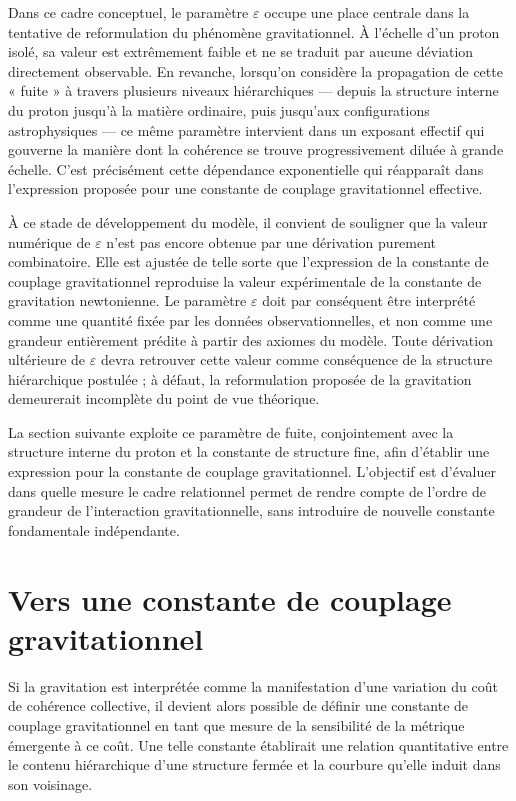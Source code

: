 \documentclass[11pt,a4paper]{article}
\begin{document}
Dans ce cadre conceptuel, le paramètre \(\varepsilon\) occupe une place centrale dans la tentative de reformulation du phénomène gravitationnel. À l’échelle d’un proton isolé, sa valeur est extrêmement faible et ne se traduit par aucune déviation directement observable. En revanche, lorsqu’on considère la propagation de cette « fuite » à travers plusieurs niveaux hiérarchiques — depuis la structure interne du proton jusqu’à la matière ordinaire, puis jusqu’aux configurations astrophysiques — ce même paramètre intervient dans un exposant effectif qui gouverne la manière dont la cohérence se trouve progressivement diluée à grande échelle. C’est précisément cette dépendance exponentielle qui réapparaît dans l’expression proposée pour une constante de couplage gravitationnel effective.

À ce stade de développement du modèle, il convient de souligner que la valeur numérique de \(\varepsilon\) n’est pas encore obtenue par une dérivation purement combinatoire. Elle est ajustée de telle sorte que l’expression de la constante de couplage gravitationnel reproduise la valeur expérimentale de la constante de gravitation newtonienne. Le paramètre \(\varepsilon\) doit par conséquent être interprété comme une quantité fixée par les données observationnelles, et non comme une grandeur entièrement prédite à partir des axiomes du modèle. Toute dérivation ultérieure de \(\varepsilon\) devra retrouver cette valeur comme conséquence de la structure hiérarchique postulée ; à défaut, la reformulation proposée de la gravitation demeurerait incomplète du point de vue théorique.

La section suivante exploite ce paramètre de fuite, conjointement avec la structure interne du proton et la constante de structure fine, afin d’établir une expression pour la constante de couplage gravitationnel. L’objectif est d’évaluer dans quelle mesure le cadre relationnel permet de rendre compte de l’ordre de grandeur de l’interaction gravitationnelle, sans introduire de nouvelle constante fondamentale indépendante.

\section{Vers une constante de couplage gravitationnel}

Si la gravitation est interprétée comme la manifestation d’une variation du coût de cohérence collective, il devient alors possible de définir une constante de couplage gravitationnel en tant que mesure de la sensibilité de la métrique émergente à ce coût. Une telle constante établirait une relation quantitative entre le contenu hiérarchique d’une structure fermée et la courbure qu’elle induit dans son voisinage.
\end{document}
